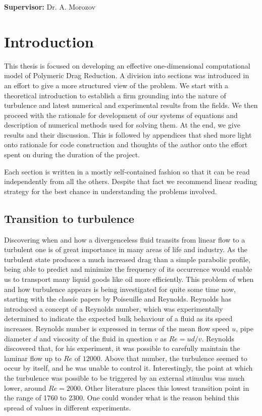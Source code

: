 \documentclass[11pt,a4paper]{article}
\begin{document}
\vfill
{\bf Supervisor:} Dr. A. Morozov
\thispagestyle{empty}
\newpage
\setcounter{page}{1}
\footruleheight{1pt}
\headruleheight{1pt}
\rhead{- \thepage}
\cfoot{}
\tableofcontents
\newpage

\section{Introduction}

This thesis is focused on developing an effective one-dimensional computational model of Polymeric Drag Reduction.
A division into sections was introduced in an effort to give a more structured view of the problem.
We start with a theoretical introduction to establish a firm grounding into the nature of turbulence and latest numerical and experimental results from the fields.
We then proceed with the rationale for development of our systems of equations and description of numerical methods used for solving them.
At the end, we give results and their discussion.
This is followed by appendices that shed more light onto rationale for code construction and thoughts of the author onto the effort spent on during the duration of the project.

Each section is written in a mostly self-contained fashion so that it can be read independently from all the others.
Despite that fact we recommend linear reading strategy for the best chance in understanding the problems involved.


\subsection{Transition to turbulence}
Discovering when and how a divergenceless fluid transits from linear flow to a turbulent one is of great importance in many areas of life and industry.
As the turbulent state produces a much increased drag than a simple parabolic profile, being able to predict and minimize the frequency of its occurrence would enable us to transport many liquid goods like oil more efficiently.
This problem of when and how turbulence appears is being investigated for quite some time now, starting with the classic papers by Poiseuille\cite{Poiseuille40} and Reynolds\cite{Reynolds83}.
Reynolds has introduced a concept of a Reynolds number, which was experimentally determined to indicate the expected bulk behaviour of a fluid as its speed increases.
Reynolds number is expressed in terms of the mean flow speed \(u\), pipe diameter \(d\) and viscosity of the fluid in question \(v\) as \(Re = ud/v\).
Reynolds discovered that, for his experiment, it was possible to carefully maintain the laminar flow up to \(Re\) of \(12000\).
Above that number, the turbulence seemed to occur by itself, and he was unable to control it.
Interestingly, the point at which the turbulence was possible to be triggered by an external stimulus was much lower, around \(Re = 2000\).
Other literature places this lowest transition point in the range of 1760 to 2300\cite{Kerswell05}.
One could wonder what is the reason behind this spread of values in different experiments.
\end{document}
